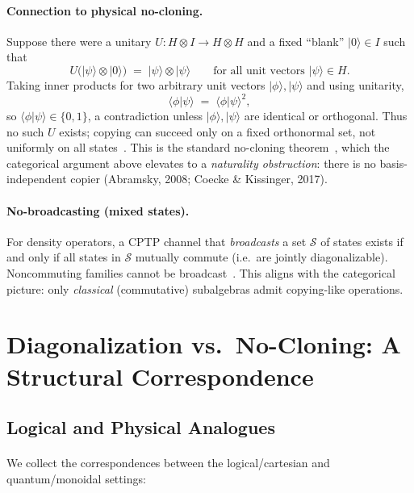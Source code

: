 \documentclass[11pt]{article}
\theoremstyle{upright}
\begin{document}
\paragraph{Connection to physical no-cloning.}
Suppose there were a unitary $U : H\otimes I \to H\otimes H$ and a fixed ``blank'' $|0\rangle\in I$ such that
\begin{equation}\label{eq:unitary-clone}
U\big(|\psi\rangle \otimes |0\rangle\big) \;=\; |\psi\rangle \otimes |\psi\rangle
\qquad \text{for all unit vectors }|\psi\rangle\in H.
\end{equation}
Taking inner products for two arbitrary unit vectors $|\phi\rangle,|\psi\rangle$ and using unitarity,
\[
\langle \phi|\psi\rangle \;=\; \big\langle \phi|\psi\big\rangle^2,
\]
so $\langle \phi|\psi\rangle \in \{0,1\}$, a contradiction unless $|\phi\rangle,|\psi\rangle$ are identical or orthogonal. Thus no such $U$ exists; copying can succeed only on a fixed orthonormal set, not uniformly on all states~\cite{WoottersZurek1982}. This is the standard no-cloning theorem~\cite{WoottersZurek1982,Dieks1982}, which the categorical argument above elevates to a \emph{naturality obstruction}: there is no basis-independent copier (Abramsky, 2008; Coecke \& Kissinger, 2017).

\paragraph{No-broadcasting (mixed states).}
For density operators, a CPTP channel that \emph{broadcasts} a set $\mathcal{S}$ of states exists if and only if all states in $\mathcal{S}$ mutually commute (i.e.\ are jointly diagonalizable). Noncommuting families cannot be broadcast~\cite{BarnumEtAl1996}. This aligns with the categorical picture: only \emph{classical} (commutative) subalgebras admit copying-like operations.

\section{Diagonalization vs.\ No-Cloning: A Structural Correspondence}
\label{sec:diag-nocloning}

\subsection{Logical and Physical Analogues}

\paragraph{}
We collect the correspondences between the logical/cartesian and quantum/monoidal settings:
\end{document}
